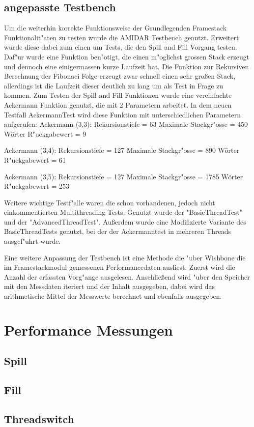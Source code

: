 \subsection{angepasste Testbench}
Um die weiterhin korrekte Funktionsweise der Grundlegenden Framestack Funktionalit"aten zu testen wurde die AMIDAR Testbench genutzt. Erweitert wurde diese dabei zum einen um Tests, die den Spill and Fill Vorgang testen. Daf"ur wurde eine Funktion ben"otigt, die einen m"oglichst gro{ss}en Stack erzeugt und dennoch eine einigerma{ss}en kurze Laufzeit hat. Die Funktion zur Rekursiven Berechnung der Fibonaci Folge erzeugt zwar schnell einen sehr großen Stack, allerdings ist die Laufzeit dieser deutlich zu lang um als Test in Frage zu kommen. Zum  Testen der Spill and Fill Funktionen wurde eine vereinfachte Ackermann Funktion genutzt, die mit 2 Parametern arbeitet.
In dem neuen Testfall AckermannTest wird diese Funktion mit unterschiedlichen Parametern aufgerufen:
Ackermann (3,3):
				Rekursionstiefe 		= 63
				Maximale Stackgr"o{ss}e = 450 Wörter
				R"uckgabewert 			= 9	
				
Ackermann (3,4):
				Rekursionstiefe			= 127
				Maximale Stackgr"o{ss}e = 890 Wörter
				R"uckgabewert			= 61

Ackermann (3,5):
				Rekursionstiefe			= 127
				Maximale Stackgr"o{ss}e = 1785 Wörter
				R"uckgabewert			= 253

Weitere wichtige Testf"alle waren die schon vorhandenen, jedoch nicht einkommentierten Multithreading Tests. Genutzt wurde der "BasicThreadTest" und der "AdvancedThreadTest". Außerdem wurde eine Modifizierte Variante des BasicThreadTests genutzt, bei der der Ackermanntest in mehreren Threads ausgef"uhrt wurde. 

Eine weitere Anpassung der Testbench ist eine Methode die "uber Wishbone die im Framestackmodul gemessenen Performancedaten ausliest.  Zuerst wird die Anzahl der erfassten Vorg"ange ausgelesen. Anschließend wird "uber den Speicher mit den Messdaten iteriert und der Inhalt ausgegeben, dabei wird das arithmetische Mittel der Messwerte berechnet und ebenfalls ausgegeben. 


\section{Performance Messungen}
\subsection{Spill}
\subsection{Fill}
\subsection{Threadswitch}
